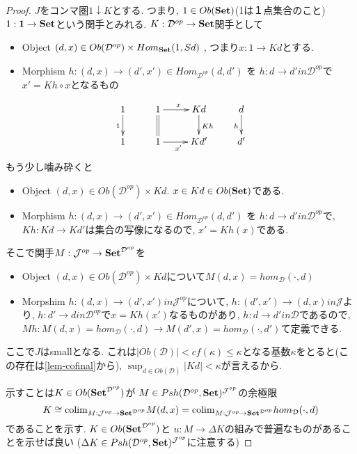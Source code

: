 \documentclass[dvipdfmx,a4paper,11pt]{report}
\newcommand{\colim}{{\rm colim}}
\theoremstyle{definition}
\begin{document}
\begin{proof}
$J$をコンマ圏$1 \downarrow K$とする.
つまり,
$1 \in Ob({\bf Set})$(1は１点集合のこと)
$1 :  {\bf 1} \to {\bf Set}$という関手とみれる. 
$K : \mathcal{D}^{op} \to {\bf Set}$関手として
\begin{itemize}
\item Object $(d,x) \in Ob(\mathcal{D}^{op}) \times Hom_{{\bf Set}}(1, Sd)$ , つまり$x : 1 \to Kd$とする. 
\item Morphism $h : (d,x)  \to (d',x') \in Hom_{\mathcal{D}^{op}}(d,d') $ を 
$h: d \to d' in \mathcal{D}^{op}$で$x'  = Kh \circ x$となるもの
\end{itemize}

\begin{equation*}
\xymatrix@C=25pt@R=20pt{
1 \ar@{->}[d] _{1}&1\ar@{=}[d] \ar@{->}[r]^{x} & Kd\ar@{->}[d]^{Kh} &d\ar@{->}[d]_{h}\\
1&1\ar@{->}[r]_{x'} &Kd'&d' \\   
}
\end{equation*}
もう少し噛み砕くと
\begin{itemize}
\item Object $(d,x) \in Ob(\mathcal{D}^{op}) \times Kd$. $x \in Kd \in Ob({\bf Set})$である.
\item Morphism $h : (d,x)  \to (d',x') \in Hom_{\mathcal{D}^{op}}(d,d')$ を
$h: d \to d' in \mathcal{D}^{op}$で, $Kh : Kd \to Kd'$は集合の写像になるので, $x' = Kh(x)$である. 
\end{itemize}

そこで関手$M : \mathcal{J}^{op} \to {\bf Set }^{\mathcal{D}^{op}}$を
\begin{itemize}
\item Object $(d,x) \in Ob(\mathcal{D}^{op}) \times Kd$について$M(d,x) = hom_{\mathcal{D}}(\cdot, d)$
\item Morpshim $h : (d,x)  \to (d',x') in \mathcal{J}^{op} $について, 
$h : (d',x') \to (d,x) in \mathcal{J}$より, 
$h : d'  \to d in \mathcal{D}^{op}$で$x = Kh(x')$なるものがあり, 
$h : d \to d' in \mathcal{D} $であるので, 
$Mh :  M(d,x) = hom_{\mathcal{D}}( \cdot, d) \to  M(d',x) = hom_{\mathcal{D}}(\cdot, d') $て定義できる. 
\end{itemize}

ここで$J$はsmallとなる.
 これは$|Ob(\mathcal{D})| < cf(\kappa) \le \kappa$となる基数$\kappa$をとると(この存在は\ref{lem-cofinal}から), $\sup_{d \in Ob(\mathcal{D})} |Kd| < \kappa$が言えるから. 

示すことは$K \in Ob({\bf Set}^{\mathcal{D}^{op}})$が
$M \in Psh(\mathcal{D}^{op},{\bf Set})^{\mathcal{J}^{op}}$の余極限
$$
K \cong  \colim_{M : \mathcal{J}^{op} \to {\bf Set }^{\mathcal{D}^{op}}}M(d,x)
=\colim_{M : \mathcal{J}^{op} \to {\bf Set }^{\mathcal{D}^{op}}} hom_{\mathcal{D}}(\cdot, d)
$$
であることを示す. 
$K \in Ob({\bf Set}^{\mathcal{D}^{op}})$と $u: M \to \Delta K$の組みで普遍なものがあることを示せば良い
($\Delta K \in Psh(\mathcal{D}^{op},{\bf Set})^{\mathcal{J}^{op}}$に注意する)


\end{proof}
\end{document}

